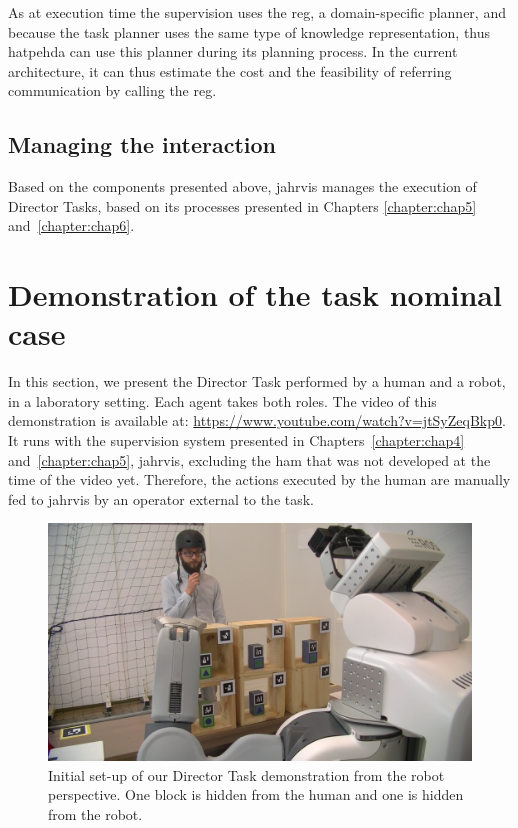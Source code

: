 \documentclass[a4paper,11pt,twoside]{StyleThese}
\begin{document}
As at execution time the supervision uses the \acrshort{reg}, a domain-specific planner, and because the task planner uses the same type of knowledge representation, thus \acrshort{hatpehda} can use this planner during its planning process. In the current architecture, it can thus estimate the cost and the feasibility of referring communication by calling the \acrshort{reg}.

\subsection{Managing the interaction}

Based on the components presented above, \acrshort{jahrvis} manages the execution of Director Tasks, based on its processes presented in Chapters \ref{chapter:chap5} and~\ref{chapter:chap6}.


\section{Demonstration of the task nominal case}

In this section, we present the Director Task performed by a human and a robot, in a laboratory setting. Each agent takes both roles. The video of this demonstration is available at: \url{https://www.youtube.com/watch?v=jtSyZeqBkp0}. It runs with the supervision system presented in Chapters~\ref{chapter:chap4} and~\ref{chapter:chap5}, \acrshort{jahrvis}, excluding the \acrlong{ham} that was not developed at the time of the video yet. Therefore, the actions executed by the human are manually fed to \acrshort{jahrvis} by an operator external to the task.

\begin{figure}[ht!]
	\centering
	\includegraphics[width=\textwidth]{figures/chapter4/config.png}
	\caption{\label{chap9:fig:expe_config} Initial set-up of our Director Task demonstration from the robot perspective. One block is hidden from the human and one is hidden from the robot.}
\end{figure}
\end{document}
